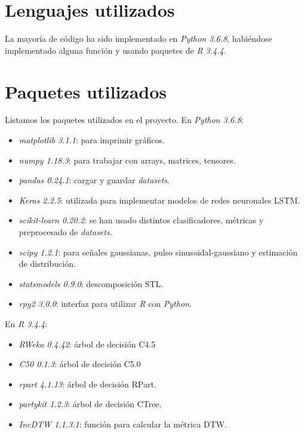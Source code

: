 \section{Lenguajes utilizados}

La mayoría de código ha sido implementado en \emph{Python 3.6.8}, habiéndose implementado alguna función y usando paquetes de \emph{R 3.4.4}.

\section{Paquetes utilizados}

Listamos los paquetes utilizados en el proyecto. En \emph{Python 3.6.8}:

\begin{itemize}
  \item \emph{matplotlib 3.1.1}: para imprimir gráficos.
  \item \emph{numpy 1.18.3}: para trabajar con arrays, matrices, tensores.
  \item \emph{pandas 0.24.1}: cargar y guardar \emph{datasets}.
  \item \emph{Keras 2.2.5}: utilizada para implementar modelos de redes neuronales LSTM.
  \item \emph{scikit-learn 0.20.2}: se han usado distintos clasificadores, métricas y preprocesado de \emph{datasets}.
  \item \emph{scipy 1.2.1}: para señales gaussianas, pulso sinusoidal-gaussiano y estimación de distribución.
  \item \emph{statsmodels 0.9.0}: descomposición STL.
  \item \emph{rpy2 3.0.0}: interfaz para utilizar \emph{R} con \emph{Python}.
\end{itemize}

En \emph{R 3.4.4}:

\begin{itemize}
  \item \emph{RWeka 0.4.42}: árbol de decisión C4.5
  \item \emph{C50 0.1.3}: árbol de decisión C5.0
  \item \emph{rpart 4.1.13}: árbol de decisión RPart.
  \item \emph{partykit 1.2.3}: árbol de decisión CTree.
  \item \emph{IncDTW 1.1.3.1}: función para calcular la métrica DTW.
\end{itemize}

\endinput
